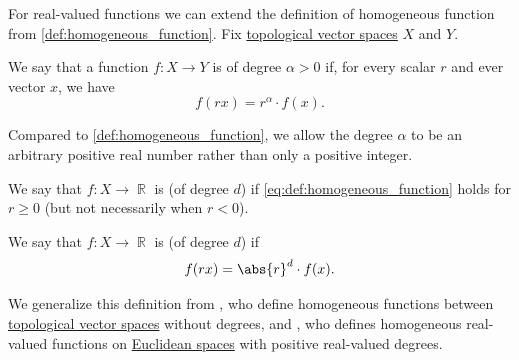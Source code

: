 \begin{definition}\label{def:real_homogeneous_function}\mimprovised
  For real-valued functions we can extend the definition of homogeneous function from \cref{def:homogeneous_function}. Fix \hyperref[def:topological_vector_space]{topological vector spaces} \( X \) and \( Y \).

  We say that a function \( f: X \to Y \) is  of degree \( \alpha > 0 \) if, for every scalar \( r \) and ever vector \( x \), we have
  \begin{equation}\label{eq:def:real_homogeneous_function}
    f(rx) = r^\alpha \cdot f(x).
  \end{equation}

  Compared to \cref{def:homogeneous_function}, we allow the degree \( \alpha \) to be an arbitrary positive real number rather than only a positive integer.

  \begin{thmenum}
     We say that \( f: X \to \BbbR \) is  (of degree \( d \)) if \eqref{eq:def:homogeneous_function} holds for \( r \geq 0 \) (but not necessarily when \( r < 0 \)).

     We say that \( f: X \to \BbbR \) is  (of degree \( d \)) if
    \begin{equation}\label{eq:def:real_homogeneous_function/absolute}
      f(rx) = \abs{r}^d \cdot f(x).
    \end{equation}
  \end{thmenum}
\end{definition}
\begin{comments}
  \item We generalize this definition from \cite[def. 2.3.1]{HillePhillips1996FunctionalAnalysis}, who define homogeneous functions between \hyperref[def:topological_vector_space]{topological vector spaces} without degrees, and \textcite[416]{Зорич2019АнализЧасть1}, who defines homogeneous real-valued functions on \hyperref[def:euclidean_space]{Euclidean spaces} with positive real-valued degrees.
\end{comments}


